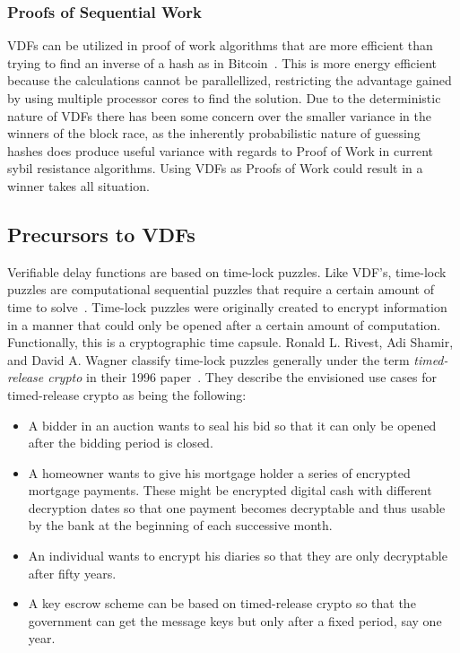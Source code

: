 \subsubsection{Proofs of Sequential Work}
VDFs can be utilized in proof of work algorithms that are more efficient than trying to find an inverse of a hash as in Bitcoin~\cite{Cohen2018-th}. This is more energy efficient because the calculations cannot be parallellized, restricting the advantage gained by using multiple processor cores to find the solution. Due to the deterministic nature of VDFs there has been some concern over the smaller variance in the winners of the block race, as the inherently probabilistic nature of guessing hashes does produce useful variance with regards to Proof of Work in current sybil resistance algorithms. Using VDFs as Proofs of Work could result in a winner takes all situation.~\cite{Orlicki2020-rt}

\subsection{Precursors to VDFs}
Verifiable delay functions are based on time-lock puzzles. Like VDF's, time-lock puzzles are computational sequential puzzles that require a certain amount of time to solve~\cite{Rivest1996-qr}. Time-lock puzzles were originally created to encrypt information in a manner that could only be opened after a certain amount of computation. Functionally, this is a cryptographic time capsule. Ronald L. Rivest, Adi Shamir, and David A. Wagner classify time-lock puzzles generally under the term \emph{timed-release crypto} in their 1996 paper~\cite{Rivest1996-qr}. They describe the envisioned use cases for timed-release crypto as being the following:

\begin{itemize}
	\item A bidder in an auction wants to seal his bid so that it can only be opened after the bidding period is closed.
	\item A homeowner wants to give his mortgage holder a series of encrypted mortgage payments. These might be encrypted digital cash with different decryption dates so that one payment becomes decryptable and thus usable by the bank at the beginning of each successive month.
	\item An individual wants to encrypt his diaries so that they are only decryptable after fifty years.
	\item A key escrow scheme can be based on timed-release crypto so that the government can get the message keys but only after a fixed period, say one year.
\end{itemize}

